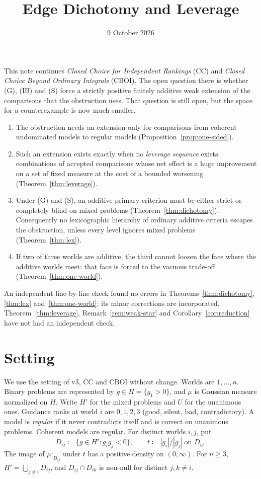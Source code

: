 \documentclass[11pt]{article}
\title{Edge Dichotomy and Leverage}
\author{}\date{9 October 2026}
\theoremstyle{remark}\newtheorem{remark}[theorem]{Remark}
\begin{document}
\maketitle

\noindent
This note continues \emph{Closed Choice for Independent Rankings} (CC) and
\emph{Closed Choice Beyond Ordinary Integrals} (CBOI). The open question there
is whether (G), (IB) and (S) force a strictly positive finitely additive weak
extension of the comparisons that the obstruction uses. That question is still
open, but the space for a counterexample is now much smaller.
\begin{enumerate}[leftmargin=*,itemsep=2pt]
\item The obstruction needs an extension only for comparisons from coherent
undominated models to regular models (Proposition~\ref{prop:one-sided}).
\item Such an extension exists exactly when no \emph{leverage sequence} exists:
combinations of accepted comparisons whose net effect is a huge improvement on
a set of fixed measure at the cost of a bounded worsening
(Theorem~\ref{thm:leverage}).
\item Under (G) and (S), an additive primary criterion must be either strict
or completely blind on mixed problems (Theorem~\ref{thm:dichotomy}).
Consequently no lexicographic hierarchy of ordinary additive criteria
escapes the obstruction, unless every level ignores mixed problems
(Theorem~\ref{thm:lex}).
\item If two of three worlds are additive, the third cannot loosen the face
where the additive worlds meet: that face is forced to the vacuous trade-off
(Theorem~\ref{thm:one-world}).
\end{enumerate}
An independent line-by-line check found no errors in
Theorems~\ref{thm:dichotomy}, \ref{thm:lex} and~\ref{thm:one-world}; its
minor corrections are incorporated. Theorem~\ref{thm:leverage},
Remark~\ref{rem:weak-star} and Corollary~\ref{cor:reduction} have not had an
independent check.

\section{Setting}

We use the setting of v3, CC and CBOI without change. Worlds are
$1,\ldots,n$. Binary problems are represented by $g\in H=\{g_1>0\}$, and
$\mu$ is Gaussian measure normalized on $H$. Write $H'$ for the mixed problems
and $U$ for the unanimous ones. Guidance ranks at world $i$ are $0,1,2,3$
(good, silent, bad, contradictory). A model is \emph{regular} if it never
contradicts itself and is correct on unanimous problems. Coherent models are
regular. For distinct worlds $i,j$, put
\[
 D_{ij}\coloneqq\{g\in H':g_ig_j<0\},\qquad
 t\coloneqq|g_i|/|g_j|\ \text{on }D_{ij}.
\]
The image of $\mu|_{D_{ij}}$ under $t$ has a positive density on $(0,\infty)$.
For $n\ge3$, $H'=\bigcup_{j\ne i}D_{ij}$, and $D_{ij}\cap D_{ik}$ is non-null
for distinct $j,k\ne i$.
\end{document}
